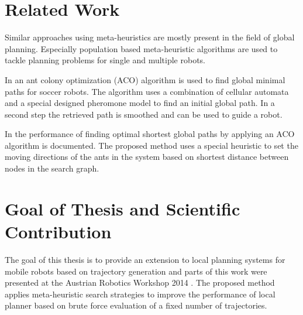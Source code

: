 \section{Related Work}\label{sec:relwork}
Similar approaches using meta-heuristics are mostly present in the field of global planning. Especially population based meta-heuristic algorithms are used to tackle planning problems for single and multiple robots.

In \cite{zhou2010improvedantcolony} an ant colony optimization (ACO) algorithm is used to find global minimal paths for soccer robots. The algorithm uses a combination of cellular automata and a special designed pheromone model to find an initial global path. In a second step the retrieved path is smoothed and can be used to guide a robot.

In \cite{buniyamin2011robotantcolony} the performance of finding optimal shortest global paths by applying an ACO algorithm is documented. The proposed method uses a special heuristic to set the moving directions of the ants in the system based on shortest distance between nodes in the search graph.  



\section{Goal of Thesis and Scientific Contribution}\label{sec:goal}
The goal of this thesis is to provide an extension to local planning systems for mobile robots based on trajectory generation and parts of this work were presented at the Austrian Robotics Workshop 2014 \cite{myself}. 
The proposed method applies meta-heuristic search strategies to improve the performance of local planner based on brute force evaluation of a fixed number of trajectories.

